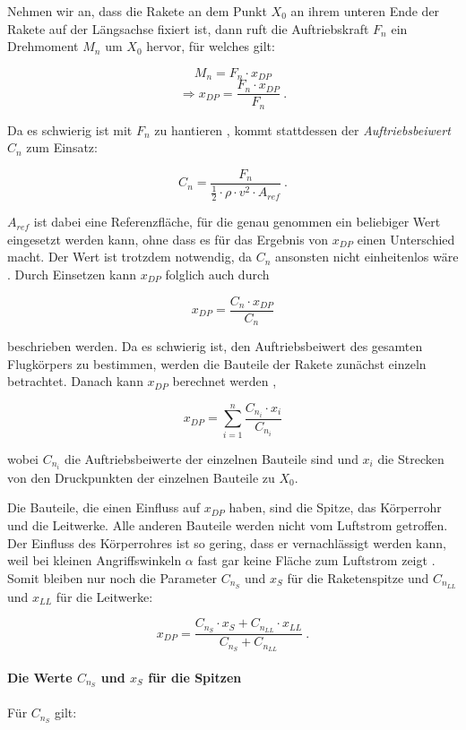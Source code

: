 \documentclass[10pt,a4paper]{article}
\begin{document}
\noindent
Nehmen wir an, dass die Rakete an dem Punkt $X_{0}$ an ihrem unteren Ende der Rakete auf der Längsachse fixiert ist, dann ruft die Auftriebskraft $F_{n}$ ein Drehmoment $M_{n}$ um $X_{0}$ hervor, für welches gilt:

\[ M_{n} = F_{n} \cdot x_{DP} \]
\[ \Rightarrow x_{DP} = \frac{F_{n} \cdot x_{DP}}  {F_{n}} \ . \]

\noindent
Da es schwierig ist mit $F_{n}$ zu hantieren \cite{sn}, kommt stattdessen der \textit{Auftriebsbeiwert} $C_{n}$ zum Einsatz:

\[ C_{n} = \dfrac{F_{n}}{\tfrac{1}{2} \cdot \rho \cdot v^{2} \cdot A_{ref}} \ . \]

\noindent
$A_{ref}$ ist dabei eine Referenzfläche, für die genau genommen ein beliebiger Wert eingesetzt werden kann, ohne dass es für das Ergebnis von $x_{DP}$ einen Unterschied macht. Der Wert ist trotzdem notwendig, da $C_{n}$ ansonsten nicht einheitenlos wäre \cite{sn}.
Durch Einsetzen kann $x_{DP}$ folglich auch durch

\[ x_{DP} = \frac{C_{n} \cdot x_{DP}}{C_{n}}  \]

\noindent
beschrieben werden. Da es schwierig ist, den Auftriebsbeiwert des gesamten Flugkörpers zu bestimmen, werden die Bauteile der Rakete zunächst einzeln betrachtet. Danach kann $x_{DP}$  berechnet werden \cite{AbR,sn},

\[ x_{DP} = \sum_{i=1}^{n} \frac{C_{n_{i}} \cdot x_{i}} {C_{n_{i}}}  \]

\noindent
wobei $C_{n_{i}}$ die Auftriebsbeiwerte der einzelnen Bauteile sind und $x_{i}$ die Strecken von den Druckpunkten der einzelnen Bauteile zu $X_{0}$.

Die Bauteile, die einen Einfluss auf $x_{DP}$ haben, sind die Spitze, das Körperrohr und die Leitwerke. Alle anderen Bauteile werden nicht vom Luftstrom getroffen. Der Einfluss des Körperrohres ist so gering, dass er vernachlässigt werden kann, weil bei kleinen Angriffswinkeln $\alpha$ fast gar keine Fläche zum Luftstrom zeigt \cite{AbR}. Somit bleiben nur noch die Parameter $C_{n_{S}}$ und $x_{S}$ für die Raketenspitze und $C_{n_{LL}}$ und $x_{LL}$ für die Leitwerke:

\begin{equation}
x_{DP} = \frac{C_{n_{S}} \cdot x_{S} + C_{n_{LL}} \cdot x_{LL}} {C_{n_{S}} + C_{n_{LL}}} \ .
\end{equation}

\paragraph{Die Werte $C_{n_{S}}$ und $x_{S}$ für die Spitzen} 
Für $C_{n_{S}}$ gilt:
\end{document}

